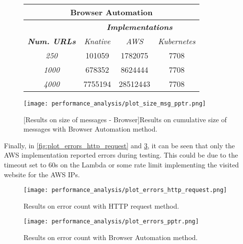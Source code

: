 \documentclass[../thesis.tex]{subfiles}
\begin{document}
\begin{figure}[H]
    \centering
    \begin{tabular}{|c|c|c|c|}
        \hline
        \multicolumn{4}{|c|}{\textbf{Browser Automation}} \\
        \hline
        & \multicolumn{3}{c|}{\textit{\textbf{Implementations}}} \\
        \hline
        \textit{\textbf{Num. URLs}} & \multicolumn{1}{c|}{\textit{Knative}} & \multicolumn{1}{c|}{\textit{AWS}} & \multicolumn{1}{c|}{\textit{Kubernetes}} \\
        \hline
        \textit{250} & 101059 & 1782075 & 7708 \\
        \hline
        \textit{1000} & 678352 & 8624444 & 7708 \\
        \hline
        \textit{4000}  & 7755194 & 28512443 & 7708 \\
        \hline
    \end{tabular}
    
    \vspace{\floatsep}

    \texttt{[image: performance\_analysis/plot\_size\_msg\_pptr.png]}

    [Results on size of messages - Browser]{Results on cumulative size of messages with Browser Automation method.}\label{fig:plot_size_msg_pptr}
\end{figure}

\newpage

Finally, in \autoref{fig:plot_errors_http_request} and \ref{fig:plot_errors_pptr}, it can be seen that only the \acrshort{AWS} implementation reported errors during testing. This could be due to the timeout set to 60s on the Lambda or some rate limit implementing the visited website for the \acrshort{AWS} \acrshort{IP}s.

\vspace*{3cm}

\begin{figure}[H]
    \centering
    \texttt{[image: performance\_analysis/plot\_errors\_http\_request.png]}
    \caption[Results on error count - HTTP]{Results on error count with \acrshort{HTTP} request method.}\label{fig:plot_errors_http_request}
\end{figure}

\begin{figure}[H]
    \centering
    \texttt{[image: performance\_analysis/plot\_errors\_pptr.png]}
    \caption[Results on error count - Browser]{Results on error count with Browser Automation method.}\label{fig:plot_errors_pptr}
\end{figure}
\end{document}
